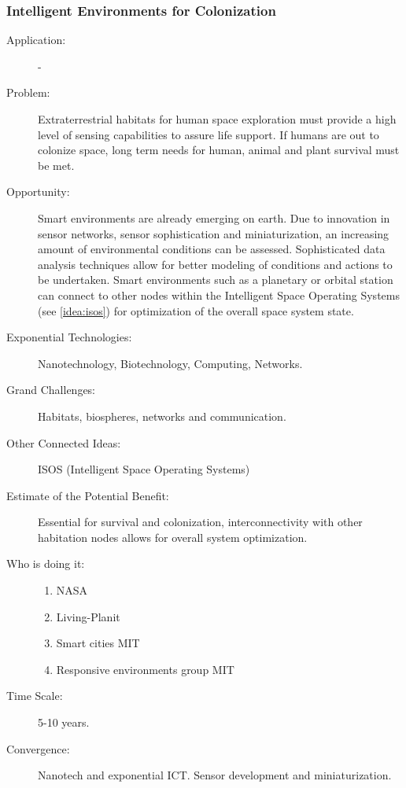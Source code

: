     \subsubsection{Intelligent Environments for Colonization} 
    \label{i2e}
\begin{description}  \item[Application:] -
 
   \item[Problem:] Extraterrestrial habitats for human space exploration  must provide a high level of sensing capabilities to assure life  support. If humans are out to colonize space, long term needs for human,  animal and plant survival must be met.
  
   \item[Opportunity:] Smart environments are already emerging on earth.  Due to innovation in sensor networks, sensor sophistication and  miniaturization, an increasing amount of environmental conditions can be  assessed. Sophisticated data analysis techniques allow for better  modeling of conditions and actions to be undertaken. Smart environments  such as a planetary or orbital station can connect to other nodes within  the Intelligent Space Operating Systems (see \autoref{idea:isos}) for optimization of  the overall space system state.
 
   \item[Exponential Technologies:] Nanotechnology, Biotechnology,  Computing, Networks.
 
   \item[Grand Challenges:] Habitats, biospheres, networks and  communication.
 
   \item[Other Connected Ideas:]  ISOS (Intelligent Space Operating  Systems)
 
   \item[Estimate of the Potential Benefit:] Essential for survival and  colonization, interconnectivity with other habitation nodes allows for  overall system optimization.
 
   \item[Who is doing it:]
  \hfill\begin{enumerate} 
     \item NASA
     \item Living-Planit
     \item Smart cities  MIT
    \item Responsive environments group MIT
     \end{enumerate}
 
   \item[Time Scale:] 5-10 years.
 
   \item[Convergence:] Nanotech and exponential ICT. Sensor development  and miniaturization.
   \end{description}


